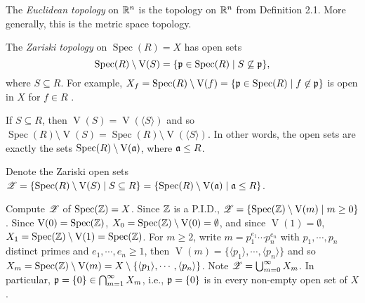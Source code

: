 \begin{example}
    The \emph{Euclidean topology} on $\mathbb{R}^n$ is the topology on $\mathbb{R}^n$ from Definition 2.1. More generally, this is the metric space topology.
\end{example}

\begin{definition}
    The \emph{Zariski topology} on $\operatorname{Spec}(R) = X$ has open sets 
    \[\operatorname{Spec}(R) \setminus \operatorname{V}(S) = \{\mathfrak{p} \in \operatorname{Spec}(R) \mid S \not \subseteq \mathfrak{p}\},\] 
    where $S \subseteq R$. For example, $X_f = \operatorname{Spec}(R) \setminus \operatorname{V}(f) = \{\mathfrak{p} \in \operatorname{Spec}(R) \mid f \not \in \mathfrak{p}\}$ is open in $X$ for $f \in R$ .
\end{definition}

\begin{proposition}
    If $S \subseteq R$, then $\operatorname{V}(S) = \operatorname{V}(\langle S \rangle)$ and so $\operatorname{Spec}(R) \setminus \operatorname{V}(S) = \operatorname{Spec}(R) \setminus \operatorname{V}(\langle S \rangle)$. In other words, the open sets are exactly the sets $\operatorname{Spec}(R) \setminus \operatorname{V}(\mathfrak{a})$, where $\mathfrak{a} \leq R$.
\end{proposition}

\begin{notation*}
    Denote the Zariski open sets $\mathscr{Z} = \{\operatorname{Spec}(R) \setminus \operatorname{V}(S) \mid S \subseteq R\} = \{\operatorname{Spec}(R) \setminus \operatorname{V}(\mathfrak{a}) \mid \mathfrak{a} \leq R\}$.
\end{notation*}

\begin{example}
    Compute $\mathscr{Z}$ of $\operatorname{Spec}(\mathbb{Z}) = X$. Since $\mathbb{Z}$ is a P.I.D., $\mathscr{Z} = \{\operatorname{Spec}(\mathbb{Z}) \setminus \operatorname{V}(m) \mid m \geq 0\}$. Since $\operatorname{V}(0) = \operatorname{Spec}(\mathbb{Z})$, $X_0 = \operatorname{Spec}(\mathbb{Z}) \setminus \operatorname{V}(0) = \emptyset$, and since $\operatorname{V}(1) = \emptyset$, $X_1 = \operatorname{Spec}(\mathbb{Z}) \setminus \operatorname{V}(1) = \operatorname{Spec}(\mathbb{Z})$. For $m \geq 2$, write $m = p_1^{e_1} \cdots p_n^{e_n}$ with $p_1,\cdots,p_n$ distinct primes and $e_1,\cdots,e_n \geq 1$, then $\operatorname{V}(m) = \{\langle p_1 \rangle, \cdots, \langle p_n \rangle\}$ and so $X_m = \operatorname{Spec}(\mathbb{Z}) \setminus \operatorname{V}(m) = X \setminus \{\langle p_1 \rangle,\cdots, \langle p_n \rangle\}$. Note $\mathscr{Z} = \bigcup_{m=0}^\infty X_m$. In particular, $\mathfrak{p} = \{0\} \in \bigcap_{m=1}^\infty X_m$, i.e., $\mathfrak{p} = \{0\}$ is in every non-empty open set of $X$.
\end{example}

